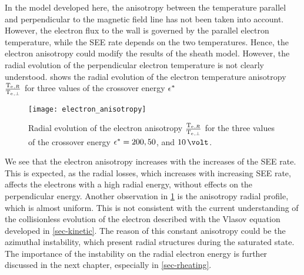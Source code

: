 \vspace{1ex}
In the model developed here, the anisotropy between the temperature parallel and perpendicular to the magnetic field line has not been taken into account.
However, the electron flux to the wall is governed by the parallel electron temperature, while the \ac{SEE} rate depends on the two temperatures.
Hence, the electron anisotropy could modify the results of the sheath model.
However, the radial evolution of the perpendicular electron temperature is not clearly understood.
 shows the radial evolution of the electron temperature anisotropy  $\frac{\mathrm{T_e}{}_{, R}}{\mathrm{T_e}{}_{, \perp}}$ for three values of the crossover energy $\epsilon^{*}$

\begin{figure}[!ht]
  \centering
  \texttt{[image: electron\_anisotropy]}
  \caption{Radial evolution of the electron anisotropy $\frac{\mathrm{T_e}{}_{, R}}{\mathrm{T_e}{}_{, \perp}}$ for the three values of the crossover energy $\epsilon^{*}=200, 50$, and $10\,\volt$.}
  \label{fig-anisotropy}
\end{figure}

We see that the electron anisotropy increases with the increases of the \ac{SEE} rate.
This is expected, as the radial losses, which increases with increasing \ac{SEE} rate, affects the electrons with a high radial energy, without effects on the perpendicular energy.
Another observation in \cref{fig-anisotropy} is the anisotropy radial profile, which is almost uniform.
This is not consistent with the current understanding of the collisionless evolution of the electron described with the Vlasov equation developed in \cref{sec-kinetic}.
The reason of this constant anisotropy could be the azimuthal instability, which present radial structures during the saturated state.
The importance of the instability on the radial electron energy is further discussed in the next chapter, especially in \cref{sec-rheating}.






